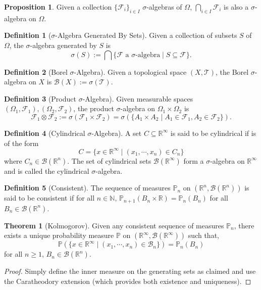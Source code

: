 \documentclass[]{article}
\theoremstyle{definition}
\newtheorem{theorem}{Theorem}
\theoremstyle{definition}
\newtheorem{definition}{Definition}[section]
\newtheorem{proposition}{Proposition}[section]
\begin{document}
\begin{proposition}
  Given a collection \(\{\mathcal{F}_i\}_{i \in I}\) \(\sigma\)-algebras of \(\Omega\),  
  \(\bigcap_{i \in I} \mathcal{F}_i\) is also a \(\sigma\)-algebra on \(\Omega\).
\end{proposition}

\begin{definition}[\(\sigma\)-Algebra Generated By Sets]
  Given a collection of subsets \(S\) of \(\Omega\), the \(\sigma\)-algebra generated 
  by \(S\) is 
  \[\sigma(S) := \bigcap \{\mathcal{F} \text{ a }\sigma\text{-algebra} \mid S \subseteq \mathcal{F}\}.\]
\end{definition}

\begin{definition}[Borel \(\sigma\)-Algebra]
  Given a topological space \((X, \mathcal{T})\), the Borel \(\sigma\)-algebra 
  on \(X\) is \(\mathcal{B}(X) := \sigma(\mathcal{T})\).
\end{definition}

\begin{definition}[Product \(\sigma\)-Algebra]
  Given measurable spaces \((\Omega_1, \mathcal{F}_1), (\Omega_2, \mathcal{F}_2)\), 
  the product \(\sigma\)-algebra on \(\Omega_1 \times \Omega_2\) is 
  \[\mathcal{F}_1 \otimes \mathcal{F}_2 := 
    \sigma(\mathcal{F}_1 \times \mathcal{F}_2) = 
    \sigma(\{A_1 \times A_2 \mid A_1 \in \mathcal{F}_1, A_2 \in \mathcal{F}_2\}).\]
\end{definition}

\begin{definition}[Cylindrical \(\sigma\)-Algebra]
  A set \(C \subseteq \mathbb{R}^\infty\) is said to be cylindrical if is of the 
  form 
  \[C = \{x \in \mathbb{R}^\infty \mid (x_1, \cdots, x_n) \in C_n\}\]
  where \(C_n \in \mathcal{B}(\mathbb{R}^n)\). The set of cylindrical sets 
  \(\mathcal{B}(\mathbb{R}^\infty)\) form 
  a \(\sigma\)-algebra on \(\mathbb{R}^\infty\) and is called the cylindrical 
  \(\sigma\)-algebra.
\end{definition}

\begin{definition}[Consistent]
  The sequence of measures \(\mathbb{P}_n\) on \((\mathbb{R}^n, \mathcal{B}(\mathbb{R}^n))\)
  is said to be consistent if for all \(n \in \mathbb{N}\), 
  \(\mathbb{P}_{n + 1}(B_n \times \mathbb{R}) = \mathbb{P}_n(B_n)\) 
  for all \(B_n \in \mathcal{B}(\mathbb{R}^n)\).
\end{definition}

\begin{theorem}[Kolmogorov]
  Given any consistent sequence of measures \(\mathbb{P}_n\), there exists a unique 
  probability measure \(\mathbb{P}\) on \((\mathbb{R}^\infty, \mathcal{B}(\mathbb{R}^\infty))\) 
  such that, 
  \[\mathbb{P}(\{x \in \mathbb{R}^\infty \mid (x_1, \cdots, x_n) \in \mathcal{B}_n\}) = 
    \mathbb{P}_n(B_n)\]
  for all \(n \ge 1\), \(B_n \in \mathcal{B}(\mathbb{R}^n)\).
\end{theorem}
\begin{proof}
  Simply define the inner measure on the generating sets as claimed and use 
  the Caratheodory extension (which provides both existence and uniqueness).
\end{proof}
\end{document}
